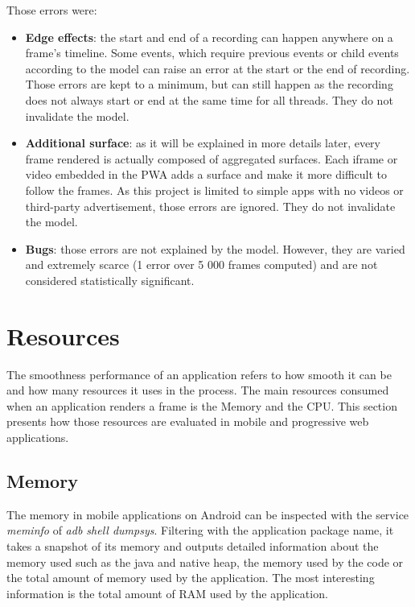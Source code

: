 \documentclass{kththesis}
\begin{document}
    Those errors were:
    \begin{itemize}
        \item \textbf{Edge effects}: the start and end of a recording can happen anywhere on a frame's timeline. Some events, which require previous events or child events according to the model can raise an error at the start or the end of recording. Those errors are kept to a minimum, but can still happen as the recording does not always start or end at the same time for all threads. They do not invalidate the model.
        \item \textbf{Additional surface}: as it will be explained in more details later, every frame rendered is actually composed of aggregated surfaces. Each iframe or video embedded in the PWA adds a surface and make it more difficult to follow the frames. As this project is limited to simple apps with no videos or third-party advertisement, those errors are ignored. They do not invalidate the model.
        \item \textbf{Bugs}: those errors are not explained by the model. However, they are varied and extremely scarce (1 error over 5 000 frames computed) and are not considered statistically significant.
    \end{itemize}

\section{Resources}

The smoothness performance of an application refers to how smooth it can be and how many resources it uses in the process. The main resources consumed when an application renders a frame is the Memory and the CPU. This section presents how those resources are evaluated in mobile and progressive web applications.     

\subsection{Memory}
The memory in mobile applications on Android can be inspected with the service \textit{meminfo} of \textit{adb shell dumpsys}. Filtering with the application package name, it takes a snapshot of its memory and outputs detailed information about the memory used such as the java and native heap, the memory used by the code or the total amount of memory used by the application. The most interesting information is the total amount of RAM used by the application.
\end{document}
